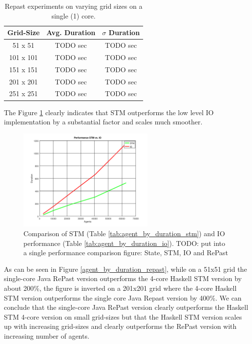\begin{table}
	\centering
  	\begin{tabular}{ c || c | c }
        Grid-Size & Avg. Duration & $\sigma$ Duration \\ \hline \hline 
   		51 x 51   & TODO sec & TODO sec \\ \hline
   		101 x 101 & TODO sec & TODO sec \\ \hline
   		151 x 151 & TODO sec & TODO sec \\ \hline
   		201 x 201 & TODO sec & TODO sec \\ \hline 
   		251 x 251 & TODO sec & TODO sec \\ \hline 
  	\end{tabular}
  	
  	\caption{Repast experiments on varying grid sizes on a single (1) core.}
	\label{tab:varyinggrid_constcores_repast}
\end{table}

The Figure \ref{fig:agent_by_duration} clearly indicates that STM outperforms the low level IO implementation by a substantial factor and scales much smoother.
\begin{figure}
	\centering
	\includegraphics[width=0.6\textwidth, angle=0]{./fig/agents_duration_stm_io.png}
	\caption{Comparison of STM (Table \ref{tab:agent_by_duration_stm}) and IO performance (Table \ref{tab:agent_by_duration_io}). TODO: put into a single performance comparison figure: State, STM, IO and RePast}
	\label{fig:agent_by_duration}
\end{figure}

As can be seen in Figure \ref{agent_by_duration_repast}, while on a 51x51 grid the single-core Java RePast version outperforms the 4-core Haskell STM version by about 200\%, the figure is inverted on a 201x201 grid where the 4-core Haskell STM version outperforms the single core Java Repast version by 400\%. We can conclude that the single-core Java RePast version clearly outperforms the Haskell STM 4-core version on small grid-sizes but that the Haskell STM version scales up with increasing grid-sizes and clearly outperforms the RePast version with increasing number of agents.

